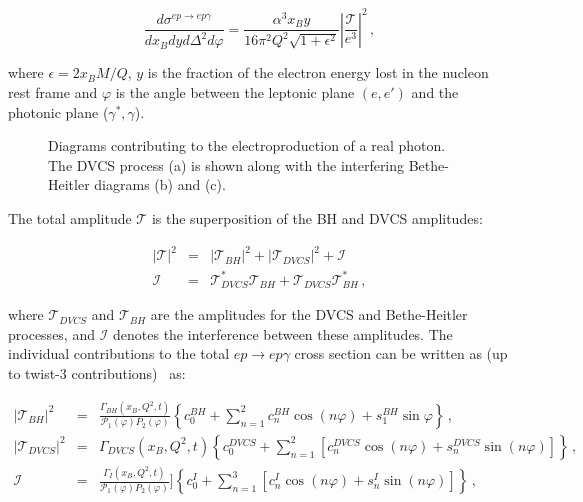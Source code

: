 \begin{equation}
\frac{d\sigma^{e p \to e p \gamma}}{dx_B dy d\Delta^2 d\varphi} =
\frac{\alpha^3 x_B y}{16 \pi^2 Q^2 \sqrt{1+\epsilon^2}}
\left | \frac{\mathcal T}{e^3} \right |^2 \, ,
\end{equation}

\vskip 0.3cm

\noindent 
where $\epsilon=2 x_B M/Q$, $y$ is the fraction of the electron energy lost
in the nucleon rest frame and $\varphi$ is the angle between the leptonic
plane $(e,e')$ and the photonic plane ($\gamma^*,\gamma$).

\begin{figure}[ht]
\centerline{}
\caption{\small{Diagrams contributing to the electroproduction of a real 
photon. The DVCS process (a) is shown along with the interfering Bethe-Heitler
diagrams (b) and (c).}} 
\label{dvcsbh}
\end{figure}

The total amplitude $\mathcal T$ is the superposition of the BH and DVCS 
amplitudes:

\begin{eqnarray}
\left | \mathcal T \right |^2 & = & \left | \mathcal T_{BH} \right |^2+\left |
\mathcal T_{DVCS} \right |^2+ \mathcal I \\
\mathcal I & = & \mathcal T_{DVCS}^* \mathcal T_{BH} +
\mathcal T_{DVCS} \mathcal T_{BH}^* \, ,
\end{eqnarray}

\noindent 
where $\mathcal T_{DVCS}$ and $\mathcal T_{BH}$ are the amplitudes for the 
DVCS and Bethe-Heitler processes, and $\mathcal I$ denotes the interference 
between these amplitudes. The individual contributions to the total 
$e p \to e p \gamma$ cross section can be written as (up to twist-3 
contributions)~\cite{Belitsky:2001ns} as:

\begin{eqnarray}
\left| \mathcal T_{BH} \right|^2 & = & \frac{\Gamma_{BH}(x_B,Q^2,t)}{\mathcal P_1(\varphi) P_2(\varphi)}
\left\{ c_0^{BH} + \sum_{n=1}^2 c_n^{BH} \cos (n\varphi) +s_1^{BH} \sin\varphi \right\}  \, , \label{eq:epepgBH} \\
\left| \mathcal T_{DVCS} \right|^2 & = & \Gamma_{DVCS}(x_B,Q^2,t)
\left\{ c_0^{DVCS} + \sum_{n=1}^2 [ c_n^{DVCS} \cos (n\varphi) +s_n^{DVCS} \sin(n\varphi) ] \right\} \, , \label{eq:epepgDVCS} \\
\mathcal I & = & \frac{\Gamma_{I}(x_B,Q^2,t)}{\mathcal P_1(\varphi) P_2(\varphi)} ]
\left\{ c_0^{I} + \sum_{n=1}^3 [ c_n^{I} \cos (n\varphi) +s_n^{I} \sin(n\varphi) ] \right\} \, , \label{eq:epepgI}
\end{eqnarray}

